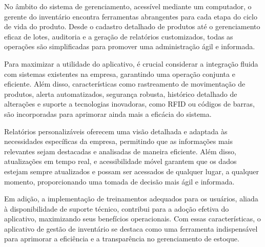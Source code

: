 No âmbito do sistema de gerenciamento, acessível mediante um computador, o gerente do inventário encontra ferramentas abrangentes para cada etapa do ciclo de vida do produto. Desde o cadastro detalhado de produtos até o gerenciamento eficaz de lotes, auditoria e a geração de relatórios customizados, todas as operações são simplificadas para promover uma administração ágil e informada.

Para maximizar a utilidade do aplicativo, é crucial considerar a integração fluida com sistemas existentes na empresa, garantindo uma operação conjunta e eficiente. Além disso, características como rastreamento de movimentação de produtos, alerta automatizados, segurança robusta, histórico detalhado de alterações e suporte a tecnologias inovadoras, como RFID ou códigos de barras, são incorporadas para aprimorar ainda mais a eficácia do sistema.

Relatórios personalizáveis oferecem uma visão detalhada e adaptada às necessidades específicas da empresa, permitindo que as informações mais relevantes sejam destacadas e analisadas de maneira eficiente. Além disso, atualizações em tempo real, e acessibilidade móvel garantem que os dados estejam sempre atualizados e possam ser acessados de qualquer lugar, a qualquer momento, proporcionando uma tomada de decisão mais ágil e informada.

Em adição, a implementação de treinamentos adequados para os usuários, aliada à disponibilidade de suporte técnico, contribui para a adoção efetiva do aplicativo, maximizando seus benefícios operacionais. Com essas características, o aplicativo de gestão de inventário se destaca como uma ferramenta indispensável para aprimorar a eficiência e a transparência no gerenciamento de estoque.
